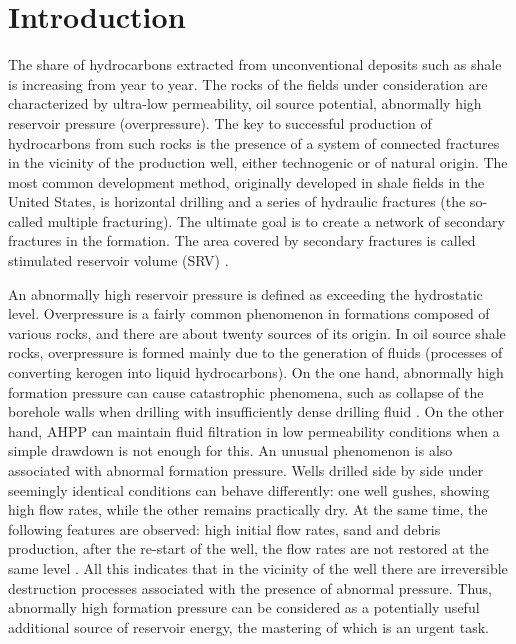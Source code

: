 \documentclass[article,authoryear,jpm]{beg_39}             %
\begin{document}


\maketitle




\section{Introduction}
\label{intro}
The share of hydrocarbons extracted from unconventional deposits such as shale is increasing from year to year.
The rocks of the fields under consideration are characterized by ultra-low permeability, oil source potential, abnormally high reservoir pressure (overpressure).
The key to successful production of hydrocarbons from such rocks is the presence of a system of connected fractures in the vicinity of the production well, either technogenic or of natural origin.
The most common development method, originally developed in shale fields in the United States, is horizontal drilling and a series of hydraulic fractures (the so-called multiple fracturing). The ultimate goal is to create a network of secondary fractures in the formation.
The area covered by secondary fractures is called stimulated reservoir volume (SRV) \cite{Warpinski, Wu, Barati, Ma2015}.

An abnormally high reservoir pressure is defined as exceeding the hydrostatic level.
Overpressure is a fairly common phenomenon in formations composed of various rocks, and there are about twenty sources of its origin.
In oil source shale rocks, overpressure is formed mainly due to the generation of fluids (processes of converting kerogen into liquid hydrocarbons).
On the one hand, abnormally high formation pressure can cause catastrophic phenomena, such as collapse of the borehole walls when drilling with insufficiently dense drilling fluid \cite{Ma2015, Li}.
On the other hand, AHPP can maintain fluid filtration in low permeability conditions when a simple drawdown is not enough for this.
An unusual phenomenon is also associated with abnormal formation pressure.
Wells drilled side by side under seemingly identical conditions can behave differently: one well gushes, showing high flow rates, while the other remains practically dry.
At the same time, the following features are observed: high initial flow rates, sand and debris production, after the re-start of the well, the flow rates are not restored at the same level \cite{Alekseev}.
All this indicates that in the vicinity of the well there are irreversible destruction processes associated with the presence of abnormal pressure.
Thus, abnormally high formation pressure can be considered as a potentially useful additional source of reservoir energy, the mastering of which is an urgent task.
\end{document}
